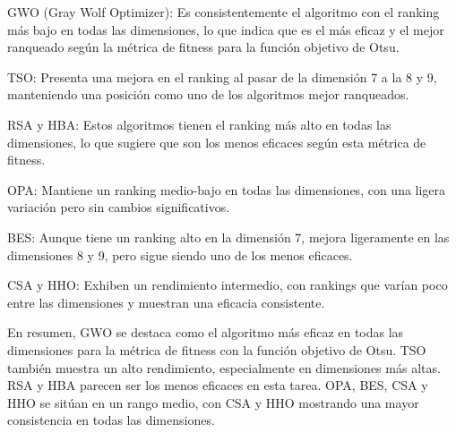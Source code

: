 \documentclass[conference]{IEEEtran}
\begin{document}
\noindent GWO (Gray Wolf Optimizer): Es consistentemente el algoritmo con el ranking más bajo en todas las dimensiones, lo que indica que es el más eficaz y el mejor ranqueado según la métrica de fitness para la función objetivo de Otsu.

\noindent TSO: Presenta una mejora en el ranking al pasar de la dimensión 7 a la 8 y 9, manteniendo una posición como uno de los algoritmos mejor ranqueados.

\noindent RSA y HBA: Estos algoritmos tienen el ranking más alto en todas las dimensiones, lo que sugiere que son los menos eficaces según esta métrica de fitness.

\noindent OPA: Mantiene un ranking medio-bajo en todas las dimensiones, con una ligera variación pero sin cambios significativos.

\noindent BES: Aunque tiene un ranking alto en la dimensión 7, mejora ligeramente en las dimensiones 8 y 9, pero sigue siendo uno de los menos eficaces.

\noindent CSA y HHO: Exhiben un rendimiento intermedio, con rankings que varían poco entre las dimensiones y muestran una eficacia consistente.

\noindent En resumen, GWO se destaca como el algoritmo más eficaz en todas las dimensiones para la métrica de fitness con la función objetivo de Otsu. TSO también muestra un alto rendimiento, especialmente en dimensiones más altas. RSA y HBA parecen ser los menos eficaces en esta tarea. OPA, BES, CSA y HHO se sitúan en un rango medio, con CSA y HHO mostrando una mayor consistencia en todas las dimensiones.
\end{document}
